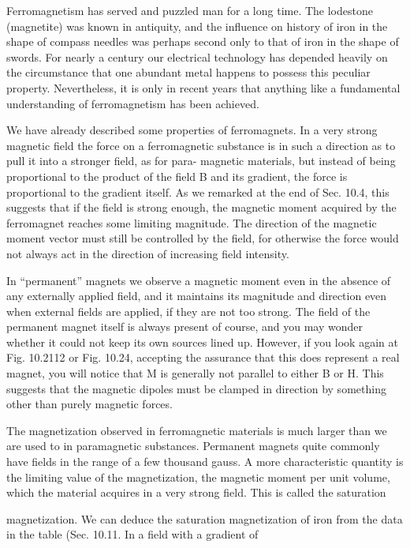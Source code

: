 {{{Ferromagnetism has served and puzzled man for a long time.
The lodestone (magnetite) was known in antiquity, and the influence
on history of iron in the shape of compass needles was perhaps second
only to that of iron in the shape of swords. For nearly a century
our electrical technology has depended heavily on the circumstance
that one abundant metal happens to possess this peculiar property.
Nevertheless, it is only in recent years that anything like a fundamental
understanding of ferromagnetism has been achieved.

We have already described some properties of ferromagnets. In
a very strong magnetic field the force on a ferromagnetic substance
is in such a direction as to pull it into a stronger field, as for para-
magnetic materials, but instead of being proportional to the product
of the field B and its gradient, the force is proportional to the gradient
itself. As we remarked at the end of Sec. 10.4, this suggests
that if the field is strong enough, the magnetic moment acquired by
the ferromagnet reaches some limiting magnitude. The direction
of the magnetic moment vector must still be controlled by the field,
for otherwise the force would not always act in the direction of increasing
field intensity.

In ``permanent'' magnets we observe a magnetic moment even in
the absence of any externally applied field, and it maintains its magnitude
and direction even when external fields are applied, if they
are not too strong. The field of the permanent magnet itself is always
present of course, and you may wonder whether it could not keep
its own sources lined up. However, if you look again at Fig. 10.2112
or Fig. 10.24, accepting the assurance that this does represent a real
magnet, you will notice that M is generally not parallel to either B
or H. This suggests that the magnetic dipoles must be clamped in
direction by something other than purely magnetic forces.

The magnetization observed in ferromagnetic materials is much
larger than we are used to in paramagnetic substances. Permanent
magnets quite commonly have fields in the range of a few thousand
gauss. A more characteristic quantity is the limiting value of the
magnetization, the magnetic moment per unit volume, which the
material acquires in a very strong field. This is called the saturation

magnetization. We can deduce the saturation magnetization of iron
from the data in the table (Sec. 10.11. In a field with a gradient of

}}}
